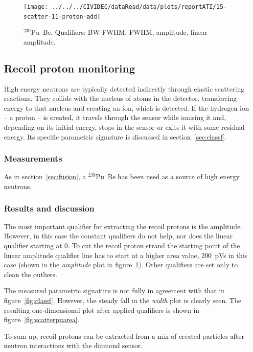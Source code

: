 \clearpage
\begin{figure}[]
\centering
\texttt{[image: ../../../CIVIDEC/dataRead/data/plots/reportATI/15-scatter-11-proton-add]}
\caption{$^{239}$Pu~Be. Qualifiers: BW-FWHM, FWHM, amplitude, linear amplitude.}
\label{fig:scatterpu}
\end{figure}

\clearpage
\subsection{Recoil proton monitoring}
High energy neutrons are typically detected indirectly through elastic scattering reactions. They collide with the nucleus of atoms in the detector, transferring energy to that nucleus and creating an ion, which is detected. If the hydrogen ion -- a proton -- is created, it travels through the sensor while ionising it and, depending on its initial energy, stops in the sensor or exits it with some residual energy. Its specific parametric signature is discussed in section~\ref{sec:classf}.

\subsubsection{Measurements}
As in section~\ref{sec:fusion}, a $^{239}$Pu~Be has been used as a source of high energy neutrons.
\subsubsection{Results and discussion}
The most important qualifier for extracting the recoil protons is the amplitude. However, in this case the constant qualifiers do not help, nor does the linear qualifier starting at 0. To cut the recoil proton strand the starting point of the linear amplitude qualifier line has to start at a higher area value, 200~pVs in this case (shown in the \emph{amplitude} plot in figure~\ref{fig:scatterpu}). Other qualifiers are set only to clean the outliers.

The measured parametric signature is not fully in agreement with that in figure~\ref{fig:classf}. However, the steady fall in the \emph{width} plot is clearly seen. The resulting one-dimensional plot after applied qualifiers is shown in figure~\ref{fig:scatterpuarea}. 

To sum up, recoil protons can be extracted from a mix of created particles after neutron interactions with the diamond sensor.



